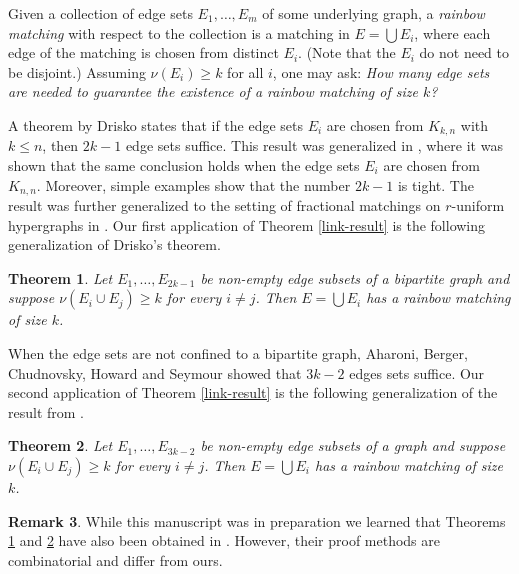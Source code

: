\documentclass[10pt]{amsart}
\newtheorem{thm}{Theorem}[section]
\theoremstyle{definition}
\newtheorem{remark}[thm]{Remark}
\begin{document}
	Given a collection of edge sets $E_1, \dots, E_m$ of some underlying graph, a {\em rainbow matching} with respect to the collection is a matching in $E=\bigcup E_i$, where each edge of the matching is chosen from distinct $E_i$. (Note that the $E_i$ do not need to be disjoint.) Assuming $\nu(E_i) \geq k$ for all $i$, one may ask: {\em How many edge sets are needed to guarantee the existence of a rainbow matching of size $k$?} 
	
	A theorem by Drisko \cite{drisko} states that if the edge sets $E_i$ are chosen from $K_{k,n}$ with $k\leq n$, then $2k-1$ edge sets suffice. This result was generalized in  \cite{rainbow_matching_bipartite}, where it was shown that the same conclusion holds when the edge sets $E_i$ are chosen from $K_{n,n}$. Moreover, simple examples show that the number $2k-1$ is tight. The result was 
	further generalized to the setting of fractional matchings on $r$-uniform hypergraphs in \cite{aharoni_holzman_jiang}. 
	Our first application of Theorem \ref{link-result} is the following generalization of Drisko's theorem.
	
	\begin{thm}\label{drisko-general}
		Let $E_1, \dots, E_{2k-1}$ be non-empty edge subsets of a bipartite graph and suppose $\nu(E_i\cup E_j)\geq k$ for every $i\neq j$. Then $E = \bigcup E_i$ has a rainbow matching of size $k$.
	\end{thm}
	
	When the edge sets are not confined to a bipartite graph, Aharoni, Berger, Chudnovsky, Howard and Seymour \cite{rainbow_matching_general} showed that  $3k-2$ edges sets suffice.  
	Our second application of Theorem \ref{link-result} is the following generalization of the result from \cite{rainbow_matching_general}.
	\begin{thm}\label{rainbow-matching-result}
		Let $E_1, \dots, E_{3k-2}$ be non-empty edge subsets of a graph and suppose $\nu(E_i\cup E_j)\geq k$ for every $i\ne j$. Then $E = \bigcup E_i$ has a rainbow matching of size $k$.
	\end{thm}
	
	\begin{remark}
		While this manuscript was in preparation we learned that Theorems \ref{drisko-general} and \ref{rainbow-matching-result} have also been obtained in \cite{rainbow_matching_general_improvement,collaborative_bipartite}. However, their proof methods are combinatorial and differ from ours. 
	\end{remark}
	
\end{document}
